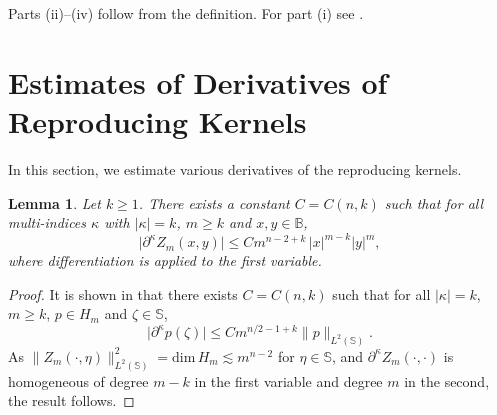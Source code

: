 \documentclass{amsart}
\newtheorem{lemma}[theorem]{Lemma}
\theoremstyle{definition}
\theoremstyle{remark}
\begin{document}
Parts (ii)--(iv) follow from the definition.
For part (i) see \cite[Lemma 3.2]{U3}.

%
\section{Estimates of Derivatives of Reproducing Kernels}
%

In this section, we estimate various derivatives of the reproducing kernels.

\begin{lemma}\label{Lderzm}
Let $k\ge 1$.
There exists a constant $C=C(n,k)$ such that
for all multi-indices $\kappa$ with $\vert\kappa\vert=k$,
$m\ge k$ and $x,y\in\mathbb B$,
\begin{equation*}
\bigl\vert\partial^\kappa Z_m(x,y)\bigr\vert
\le C m^{n-2+k}\,
\vert x\vert^{m-k}\vert y\vert^m,
\end{equation*}
where differentiation is applied to the first variable.
\end{lemma}

\begin{proof}
It is shown in \cite[Theorem 4(b)]{Se} that there exists $C=C(n,k)$
such that for all $\vert\kappa\vert=k$, $m\ge k$, $p\in H_m$
and $\zeta\in\mathbb S$,
\begin{equation*}
\vert\partial^\kappa p(\zeta)\vert
\le C m^{n/2-1+k}\|p\|_{L^2(\mathbb S)}.
\end{equation*}
As
$\|Z_m(\cdot,\eta)\|^2_{L^2(\mathbb S)}=\text{dim}\, H_m\lesssim m^{n-2}$
for $\eta\in\mathbb S$, and $\partial^\kappa Z_m(\cdot,\cdot)$ is
homogeneous of degree $m-k$ in the first variable and degree $m$ in
the second, the result follows.
\end{proof}
\end{document}
